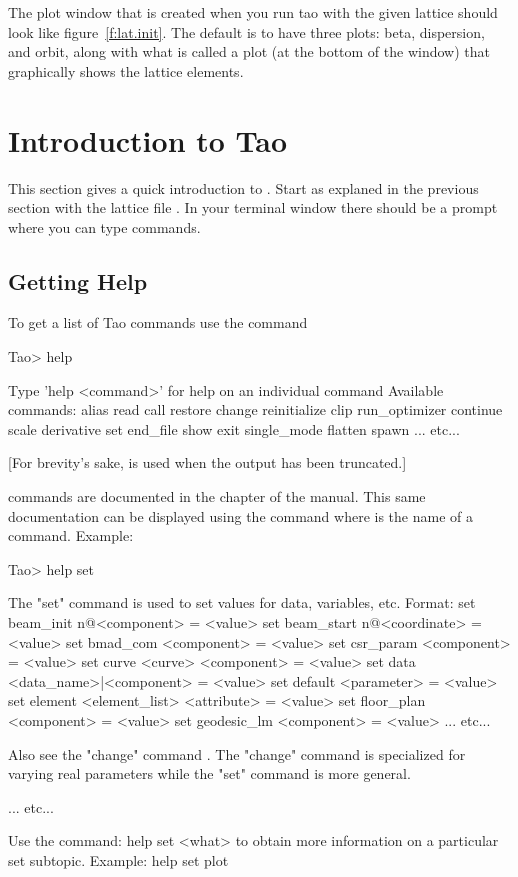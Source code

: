 \documentclass{hitec}
\newcommand{\Section}[1]{\section{#1}\vspace*{-1ex}}
\begin{document}
The plot window that is created when you run tao with the given lattice should look like
figure~\ref{f:lat.init}. The default is to have three plots: beta, dispersion, and orbit, along with
what is called a  plot (at the bottom of the window) that graphically shows the
lattice elements.

\Section{Introduction to Tao}
\label{s:tao.intro}

This section gives a quick introduction to \tao. Start \tao as explaned in the previous
section with the lattice file . In your terminal window there should be 
a  prompt where you can type \tao commands.

\subsection{Getting Help}

To get a list of Tao commands use the  command
\begin{code}
Tao> help

Type 'help <command>' for help on an individual command
Available commands:
  alias                             read
  call                              restore
  change                            reinitialize
  clip                              run_optimizer
  continue                          scale
  derivative                        set
  end_file                          show
  exit                              single_mode
  flatten                           spawn
... etc...
\end{code}
[For brevity's sake,  is used when the output has been truncated.]

\tao commands are documented in the  chapter of the \tao manual.
This same documentation can be displayed using the  command where
 is the name of a command. Example:
\begin{code}
Tao> help set

The "set" command is used to set values for data,
variables, etc. Format:
  set beam_init {n@}<component> = <value>
  set beam_start {n@}<coordinate> = <value>
  set bmad_com <component> = <value>
  set csr_param <component> = <value>
  set curve <curve> <component> = <value>
  set data <data_name>|<component> = <value>
  set default <parameter> = <value>
  set element <element_list> <attribute> = <value>
  set floor_plan <component> = <value>
  set geodesic_lm <component> = <value>
... etc...

Also see the "change" command . The "change" command is specialized
for varying real parameters while the "set" command is more general.

... etc...

Use the command:
  help set <what>
to obtain more information on a particular set subtopic. Example:
  help set plot
\end{code}
\end{document}
